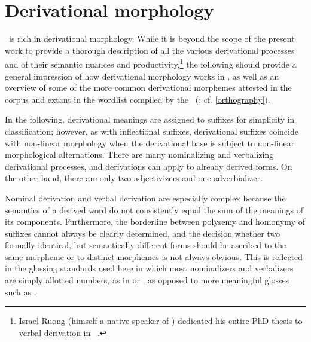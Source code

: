 


\chapter{Derivational morphology}\label{derivMorph}
\PS\ is rich in derivational morphology. While it is beyond the scope of the present work to provide a thorough description of all the various derivational processes and of their semantic nuances and productivity,\footnote{Israel Ruong (himself a native speaker of \PS) dedicated his entire PhD thesis to verbal derivation in \PS\ \citep{Ruong1943}.} %
the following should provide a general impression of how derivational morphology works in \PS, as well as an overview of some of the more common derivational morphemes attested in the corpus and extant in the wordlist compiled by the \WLP\ (\cite{insamlingPS2011}; cf. \SEC\ref{orthography}). 

In the following, derivational meanings are assigned to suffixes for simplicity in classification; however, as with inflectional suffixes, derivational suffixes coincide with non-linear morphology when the derivational base is subject to non-linear morphological alternations. %
There are many nominalizing and verbalizing derivational processes, and derivations can apply to already derived forms. 
On the other hand, there are only two adjectivizers and one adverbializer. 

Nominal derivation and verbal derivation are especially complex because the semantics of a derived word do not consistently equal the sum of the meanings of its components. Furthermore, the borderline between polysemy and homonymy of suffixes cannot always be clearly determined, and the decision whether two formally identical, but semantically different forms should be ascribed to the same morpheme or to distinct morphemes is not always obvious. 
This is reflected in the glossing standards used here in which most nominalizers and verbalizers are simply allotted numbers, as in  or , as opposed to more meaningful glosses such as . 

